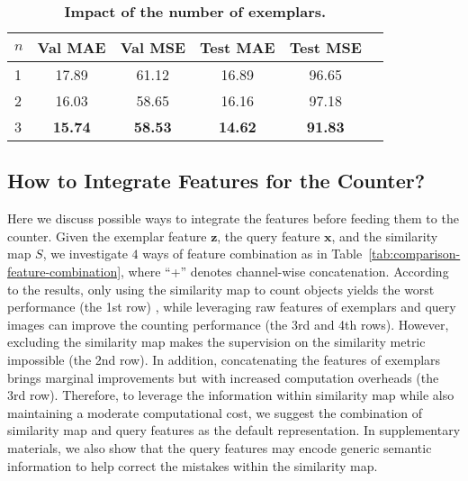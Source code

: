 \documentclass[10pt,twocolumn,letterpaper]{article}
\begin{document}
\begin{table}
  \centering
  \renewcommand{\arraystretch}{1.2}
  \addtolength{\tabcolsep}{2.5pt}
    \begin{tabular}{@{}lccccc@{}}
    \toprule
    $n$ & Val MAE & Val MSE & Test MAE & Test MSE \\ 
    \midrule
    1   & 17.89   & 61.12   & 16.89    &  96.65   \\
    2   & 16.03   & 58.65   & 16.16    &  97.18    \\
    3   & \textbf{15.74}    & \textbf{58.53} & \textbf{14.62} & \textbf{91.83} \\
    \bottomrule
    \end{tabular}
    \vspace{-10pt}
    \caption{\textbf{Impact of the number of exemplars.}}
    \label{tab:different-exemplar-number}
\end{table}

\subsection{How to Integrate Features for the Counter?}
\label{sec:feature-combination}
Here we discuss possible ways to integrate the features before feeding them to the counter. Given the exemplar feature $\boldsymbol z$, the query feature $\boldsymbol x$, and the similarity map $S$, we investigate $4$ ways of feature combination as in Table~\ref{tab:comparison-feature-combination}, where ``+'' denotes channel-wise concatenation. According to the results, only using the similarity map to count objects yields the worst performance (the 1st row) , while leveraging raw features of exemplars and query images can improve the counting performance (the 3rd and 4th rows). However, excluding the similarity map makes the supervision on the similarity metric impossible (the 2nd row). In addition, concatenating the features of exemplars brings marginal improvements but with increased computation overheads (the 3rd row). Therefore, to leverage the information within similarity map while also maintaining a moderate computational cost, we suggest the combination of similarity map and query features as the default representation. 
In supplementary materials, we also show that the query features may encode generic semantic information to help correct the mistakes within the similarity map.
\end{document}
